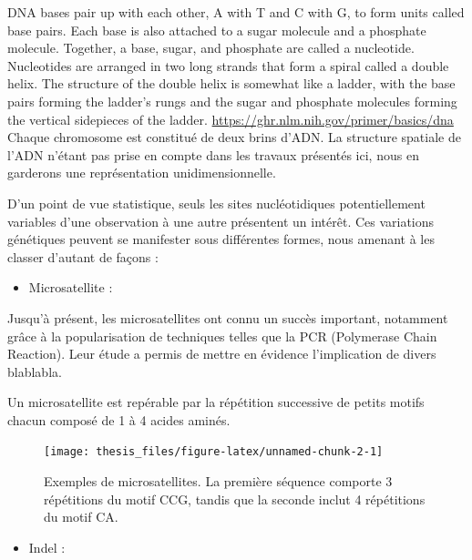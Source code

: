 \documentclass[12pt,twoside]{reedthesis}
\providecommand{\tightlist}{%
  \setlength{\itemsep}{0pt}\setlength{\parskip}{0pt}}
\begin{document}
  DNA bases pair up with each other, A with T and C with G, to form units
  called base pairs. Each base is also attached to a sugar molecule and a
  phosphate molecule. Together, a base, sugar, and phosphate are called a
  nucleotide. Nucleotides are arranged in two long strands that form a
  spiral called a double helix. The structure of the double helix is
  somewhat like a ladder, with the base pairs forming the ladder's rungs
  and the sugar and phosphate molecules forming the vertical sidepieces of
  the ladder. \url{https://ghr.nlm.nih.gov/primer/basics/dna} Chaque
  chromosome est constitué de deux brins d'ADN. La structure spatiale de
  l'ADN n'étant pas prise en compte dans les travaux présentés ici, nous
  en garderons une représentation unidimensionnelle.
  
  D'un point de vue statistique, seuls les sites nucléotidiques
  potentiellement variables d'une observation à une autre présentent un
  intérêt. Ces variations génétiques peuvent se manifester sous
  différentes formes, nous amenant à les classer d'autant de façons :
  
  \begin{itemize}
  \tightlist
  \item
    Microsatellite :
  \end{itemize}
  
  Jusqu'à présent, les microsatellites ont connu un succès important,
  notamment grâce à la popularisation de techniques telles que la PCR
  (Polymerase Chain Reaction). Leur étude a permis de mettre en évidence
  l'implication de divers blablabla.
  
  Un microsatellite est repérable par la répétition successive de petits
  motifs chacun composé de 1 à 4 acides aminés.
  
  \begin{figure}
  
  {\centering \texttt{[image: thesis\_files/figure-latex/unnamed-chunk-2-1]} 
  
  }
  
  \caption{Exemples de microsatellites. La première séquence comporte 3 répétitions du motif CCG, tandis que la seconde inclut 4 répétitions du motif CA.}\label{fig:unnamed-chunk-2}
  \end{figure}
  
  \begin{itemize}
  \tightlist
  \item
    Indel :
  \end{itemize}
  
\end{document}
